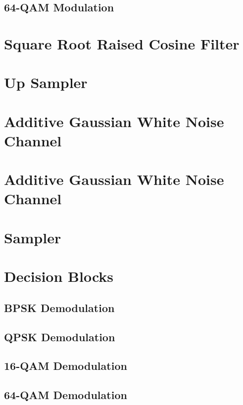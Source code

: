 \documentclass[]{article}
\begin{document}

\cleardoublepage  %
\newpage

\subsection{64-QAM Modulation }
\label{app:qam_64_mod}

\cleardoublepage  %
\newpage

\section{Square Root Raised Cosine Filter}
\label{app:sqrt_raised_cosine}

\cleardoublepage
\newpage

\section{Up Sampler}
\label{app:impulse_train}

\cleardoublepage
\newpage

\section{Additive Gaussian White Noise Channel}
\label{app:awgn_channel}

\cleardoublepage
\newpage

\section{Additive Gaussian White Noise Channel}
\label{app:awgn_channel}

\cleardoublepage
\newpage

\section{Sampler}
\label{app:sampler}

\cleardoublepage
\newpage

\section{Decision Blocks}
\label{app:dblocks}
\subsection{BPSK Demodulation}
\label{app:bpsk_demod}

\cleardoublepage
\newpage

\subsection{QPSK Demodulation}
\label{app:qpsk_demod}

\cleardoublepage
\newpage

\subsection{16-QAM Demodulation}
\label{app:qam_16_demod}

\cleardoublepage
\newpage

\subsection{64-QAM Demodulation}
\label{app:qam_64_demod}

\cleardoublepage
\newpage
\end{document}
